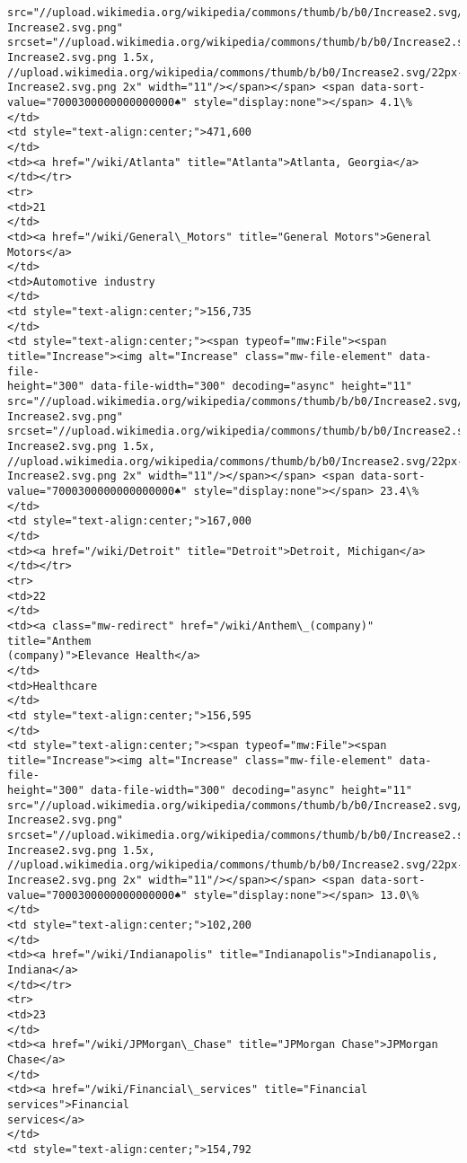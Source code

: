 \documentclass[11pt]{article}
\begin{document}
\begin{Verbatim}[commandchars=\\\{\}]
src="//upload.wikimedia.org/wikipedia/commons/thumb/b/b0/Increase2.svg/11px-
Increase2.svg.png"
srcset="//upload.wikimedia.org/wikipedia/commons/thumb/b/b0/Increase2.svg/17px-
Increase2.svg.png 1.5x,
//upload.wikimedia.org/wikipedia/commons/thumb/b/b0/Increase2.svg/22px-
Increase2.svg.png 2x" width="11"/></span></span> <span data-sort-
value="7000300000000000000♠" style="display:none"></span> 4.1\%
</td>
<td style="text-align:center;">471,600
</td>
<td><a href="/wiki/Atlanta" title="Atlanta">Atlanta, Georgia</a>
</td></tr>
<tr>
<td>21
</td>
<td><a href="/wiki/General\_Motors" title="General Motors">General Motors</a>
</td>
<td>Automotive industry
</td>
<td style="text-align:center;">156,735
</td>
<td style="text-align:center;"><span typeof="mw:File"><span
title="Increase"><img alt="Increase" class="mw-file-element" data-file-
height="300" data-file-width="300" decoding="async" height="11"
src="//upload.wikimedia.org/wikipedia/commons/thumb/b/b0/Increase2.svg/11px-
Increase2.svg.png"
srcset="//upload.wikimedia.org/wikipedia/commons/thumb/b/b0/Increase2.svg/17px-
Increase2.svg.png 1.5x,
//upload.wikimedia.org/wikipedia/commons/thumb/b/b0/Increase2.svg/22px-
Increase2.svg.png 2x" width="11"/></span></span> <span data-sort-
value="7000300000000000000♠" style="display:none"></span> 23.4\%
</td>
<td style="text-align:center;">167,000
</td>
<td><a href="/wiki/Detroit" title="Detroit">Detroit, Michigan</a>
</td></tr>
<tr>
<td>22
</td>
<td><a class="mw-redirect" href="/wiki/Anthem\_(company)" title="Anthem
(company)">Elevance Health</a>
</td>
<td>Healthcare
</td>
<td style="text-align:center;">156,595
</td>
<td style="text-align:center;"><span typeof="mw:File"><span
title="Increase"><img alt="Increase" class="mw-file-element" data-file-
height="300" data-file-width="300" decoding="async" height="11"
src="//upload.wikimedia.org/wikipedia/commons/thumb/b/b0/Increase2.svg/11px-
Increase2.svg.png"
srcset="//upload.wikimedia.org/wikipedia/commons/thumb/b/b0/Increase2.svg/17px-
Increase2.svg.png 1.5x,
//upload.wikimedia.org/wikipedia/commons/thumb/b/b0/Increase2.svg/22px-
Increase2.svg.png 2x" width="11"/></span></span> <span data-sort-
value="7000300000000000000♠" style="display:none"></span> 13.0\%
</td>
<td style="text-align:center;">102,200
</td>
<td><a href="/wiki/Indianapolis" title="Indianapolis">Indianapolis, Indiana</a>
</td></tr>
<tr>
<td>23
</td>
<td><a href="/wiki/JPMorgan\_Chase" title="JPMorgan Chase">JPMorgan Chase</a>
</td>
<td><a href="/wiki/Financial\_services" title="Financial services">Financial
services</a>
</td>
<td style="text-align:center;">154,792

\end{Verbatim}
\end{document}
